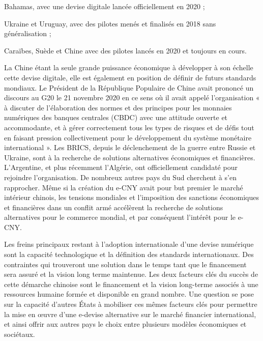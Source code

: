 \documentclass[a4paper]{article}
\begin{document}
    Bahamas, avec une devise digitale lancée officiellement en 2020 ;

    Ukraine et Uruguay, avec des pilotes menés et finalisés en 2018 sans généralisation ;

    Caraïbes, Suède et Chine avec des pilotes lancés en 2020 et toujours en cours.

La Chine étant la seule grande puissance économique à développer à son échelle cette devise digitale, elle est également en position de définir de futurs standards mondiaux. Le Président de la République Populaire de Chine avait prononcé un discours au G20 le 21 novembre 2020 en ce sens où il avait appelé l’organisation « à discuter de l’élaboration des normes et des principes pour les monnaies numériques des banques centrales (CBDC) avec une attitude ouverte et accommodante, et à gérer correctement tous les types de risques et de défis tout en faisant pression collectivement pour le développement du système monétaire international ». Les BRICS, depuis le déclenchement de la guerre entre Russie et Ukraine, sont à la recherche de solutions alternatives économiques et financières. L’Argentine, et plus récemment l’Algérie, ont officiellement candidaté pour rejoindre l’organisation. De nombreux autres pays du Sud cherchent à s’en rapprocher. Même si la création du e-CNY avait pour but premier le marché intérieur chinois, les tensions mondiales et l’imposition des sanctions économiques et financières dans un conflit armé accélèrent la recherche de solutions alternatives pour le commerce mondial, et par conséquent l’intérêt pour le e-CNY. 

Les freins principaux restant à l’adoption internationale d’une devise numérique sont la capacité technologique et la définition des standards internationaux. Des contraintes qui trouveront une solution dans le temps tant que le financement sera assuré et la vision long terme maintenue. Les deux facteurs clés du succès de cette démarche chinoise sont le financement et la vision long-terme associés à une ressources humaine formée et disponible en grand nombre. Une question se pose sur la capacité d’autres États à mobiliser ces mêmes facteurs clés pour permettre la mise en œuvre d’une e-devise alternative sur le marché financier international, et ainsi offrir aux autres pays le choix entre plusieurs modèles économiques et sociétaux.
\end{document}
